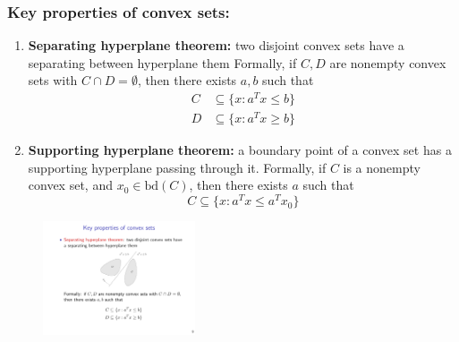 \documentclass[a4paper]{article}
\begin{document}
{\subsubsection{Key properties of convex sets:}
\begin{enumerate}
  \item \textbf{Separating hyperplane theorem:} two disjoint convex sets have a separating between hyperplane them
  Formally, if $C, D$ are nonempty convex sets with $C\cap  D = \emptyset $, then there exists $a, b$ such that
  \begin{align*}
    C & \subseteq \{x : a^T x \leq b\} \\
    D & \subseteq \{x : a^T x \geq b\} 
  \end{align*}
  \item \textbf{Supporting hyperplane theorem:} a boundary point of a convex set has a supporting hyperplane passing through it. Formally, if $C$ is a nonempty convex set, and $x_0 \in \text{bd}(C)$, then there exists $a$ such that 
  \begin{equation}
    C \subseteq \{x : a^T x \leq a^T x_0\}  \nonumber 
  \end{equation}
\end{enumerate}

\begin{figure}[htbp] 
  \centering 
  \includegraphics[width=0.4\textwidth]{img/hyperplane_separating.pdf} 
\end{figure}

}
\end{document}
